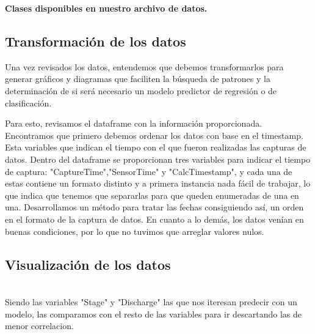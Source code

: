 \documentclass{article}
\begin{document}
       \begin{center}
           \textbf{Clases disponibles en nuestro archivo de datos.} \\
       \end{center}     
        

    \subsection{Transformación de los datos}
        Una vez revisados los datos, entendemos que debemos transformarlos para generar gráficos y diagramas que faciliten la búsqueda de patrones y la determinación de si será necesario un modelo predictor de regresión o de clasificación.
        
        Para esto, revisamos el dataframe con la información proporcionada. Encontramos que primero debemos ordenar los datos con base en el timestamp. Esta variables que indican el tiempo con el que fueron realizadas las capturas de datos. Dentro del dataframe se proporcionan tres variables para indicar el tiempo de captura: "CaptureTime","SensorTime" y "CalcTimestamp", y cada una de estas contiene un formato distinto y a primera instancia nada fácil de trabajar, lo que indica que tenemos que separarlas para que queden enumeradas de una en una. Desarrollamos un método para tratar las fechas consiguiendo así, un orden en el formato de la captura de datos. En cuanto a lo demás, los datos venían en buenas condiciones, por lo que no tuvimos que arreglar valores nulos. \\

    \subsection{Visualización de los datos}\\

        Siendo las variables "Stage" y "Discharge" las que nos iteresan predecir con un modelo, las comparamos con el resto de las variables para ir descartando las de menor correlacion.
\end{document}
